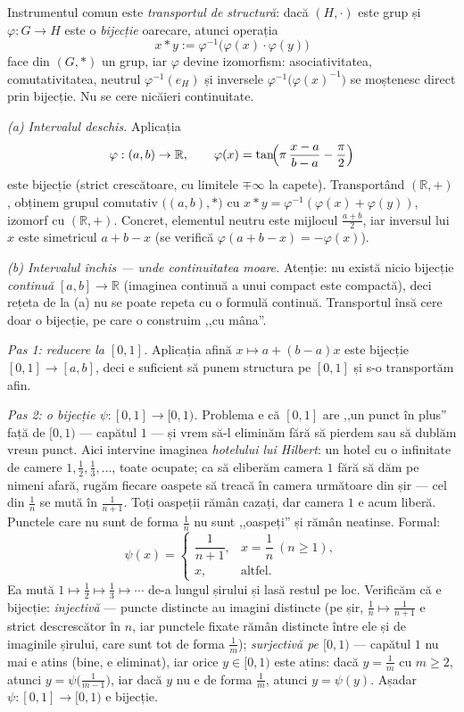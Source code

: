 \begin{solutie}
Instrumentul comun este \emph{transportul de structură}: dacă
$(H,\cdot)$ este grup și $\varphi:G\to H$ este o \emph{bijecție}
oarecare, atunci operația
\[
  x*y:=\varphi^{-1}\bigl(\varphi(x)\cdot\varphi(y)\bigr)
\]
face din $(G,*)$ un grup, iar $\varphi$ devine izomorfism: asociativitatea,
comutativitatea, neutrul $\varphi^{-1}(e_{H})$ și inversele
$\varphi^{-1}\bigl(\varphi(x)^{-1}\bigr)$ se moștenesc direct prin
bijecție. Nu se cere nicăieri continuitate.

\smallskip
\textit{(a) Intervalul deschis.} Aplicația
\[
  \varphi:(a,b)\to\mathbb{R},\qquad
  \varphi(x)=\tan\!\Bigl(\pi\,\frac{x-a}{b-a}-\frac{\pi}{2}\Bigr)
\]
este bijecție (strict crescătoare, cu limitele $\mp\infty$ la
capete). Transportând $(\mathbb{R},+)$, obținem grupul comutativ
$\bigl((a,b),*\bigr)$ cu $x*y=\varphi^{-1}(\varphi(x)+\varphi(y))$, izomorf
cu $(\mathbb{R},+)$. Concret, elementul neutru este mijlocul
$\tfrac{a+b}{2}$, iar inversul lui $x$ este simetricul $a+b-x$ (se
verifică $\varphi(a+b-x)=-\varphi(x)$).

\smallskip
\textit{(b) Intervalul închis --- unde continuitatea moare.}
Atenție: nu există nicio bijecție \emph{continuă}
$[a,b]\to\mathbb{R}$ (imaginea continuă a unui compact este compactă),
deci rețeta de la (a) nu se poate repeta cu o formulă continuă.
Transportul însă cere doar o bijecție, pe care o construim
,,cu mâna''.

\textit{Pas 1: reducere la $[0,1]$.} Aplicația afină
$x\mapsto a+(b-a)x$ este bijecție $[0,1]\to[a,b]$, deci e suficient
să punem structura pe $[0,1]$ și s-o transportăm afin.

\textit{Pas 2: o bijecție $\psi:[0,1]\to[0,1)$.} Problema e că
$[0,1]$ are ,,un punct în plus'' față de $[0,1)$ --- capătul
$1$ --- și vrem să-l eliminăm fără să pierdem sau
să dublăm vreun punct. Aici intervine imaginea \emph{hotelului lui
Hilbert}: un hotel cu o infinitate de camere $1,\tfrac12,\tfrac13,\dots$,
toate ocupate; ca să eliberăm camera $1$ fără să dăm
pe nimeni afară, rugăm fiecare oaspete să treacă în
camera următoare din șir --- cel din $\tfrac1n$ se mută în
$\tfrac{1}{n+1}$. Toți oaspeții rămân cazați, dar
camera $1$ e acum liberă. Punctele care nu sunt de forma $\tfrac1n$ nu
sunt ,,oaspeți'' și rămân neatinse. Formal:
\[
  \psi(x)=\begin{cases}\dfrac{1}{n+1}, & x=\dfrac{1}{n}\ (n\ge 1),\\[4pt]
  x, & \text{altfel.}\end{cases}
\]
Ea mută $1\mapsto\tfrac12\mapsto\tfrac13\mapsto\cdots$ de-a lungul
șirului și lasă restul pe loc. Verificăm că e
bijecție: \emph{injectivă} --- puncte distincte au imagini
distincte (pe șir, $\tfrac1n\mapsto\tfrac{1}{n+1}$ e strict
descrescător în $n$, iar punctele fixate rămân distincte
între ele și de imaginile șirului, care sunt tot de forma
$\tfrac1m$); \emph{surjectivă pe $[0,1)$} --- capătul $1$ nu mai e
atins (bine, e eliminat), iar orice $y\in[0,1)$ este atins: dacă
$y=\tfrac1m$ cu $m\ge 2$, atunci $y=\psi\!\big(\tfrac{1}{m-1}\big)$, iar
dacă $y$ nu e de forma $\tfrac1m$, atunci $y=\psi(y)$. Așadar
$\psi:[0,1]\to[0,1)$ e bijecție.


\end{solutie}
